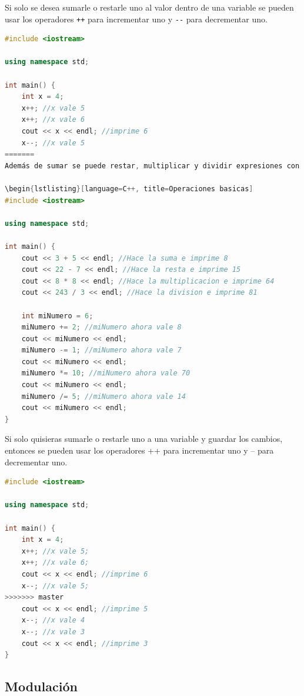 \documentclass{article}
\begin{document}
Si solo se desea sumarle o restarle uno al valor dentro de una variable se pueden usar los operadores \lstinline{++} para incrementar uno y \lstinline{--} para decrementar uno.

\begin{lstlisting}[language=C++, title=Incrementos y decrementos]
#include <iostream>

using namespace std;

int main() {
	int x = 4;
	x++; //x vale 5
	x++; //x vale 6
	cout << x << endl; //imprime 6
	x--; //x vale 5
=======
Además de sumar se puede restar, multiplicar y dividir expresiones con los símbolos -, * y / respectivamente. Además de esto, es posible hacer una operación y guardar el resultado en una variable combinando el signo con un signo de igual: +=, -=, *= y /=. El siguiente código muestra un ejemplo de todos estos operadores

\begin{lstlisting}[language=C++, title=Operaciones basicas]
#include <iostream>

using namespace std;

int main() {
	cout << 3 + 5 << endl; //Hace la suma e imprime 8
	cout << 22 - 7 << endl; //Hace la resta e imprime 15
	cout << 8 * 8 << endl; //Hace la multiplicacion e imprime 64
	cout << 243 / 3 << endl; //Hace la division e imprime 81

	int miNumero = 6;
	miNumero += 2; //miNumero ahora vale 8
	cout << miNumero << endl;
	miNumero -= 1; //miNumero ahora vale 7
	cout << miNumero << endl;
	miNumero *= 10; //miNumero ahora vale 70
	cout << miNumero << endl;
	miNumero /= 5; //miNumero ahora vale 14
	cout << miNumero << endl;
}
\end{lstlisting}

Si solo quisieras sumarle o restarle uno a una variable y guardar los cambios, entonces se pueden usar los operadores ++ para incrementar uno y -- para decrementar uno.

\begin{lstlisting}[language=C++, title=Incrementos y decrementos]
#include <iostream>

using namespace std;

int main() {
	int x = 4;
	x++; //x vale 5;
	x++; //x vale 6;
	cout << x << endl; //imprime 6
	x--; //x vale 5;
>>>>>>> master
	cout << x << endl; //imprime 5
	x--; //x vale 4
	x--; //x vale 3
	cout << x << endl; //imprime 3
}
\end{lstlisting}

\subsection{Modulación}
\end{document}
